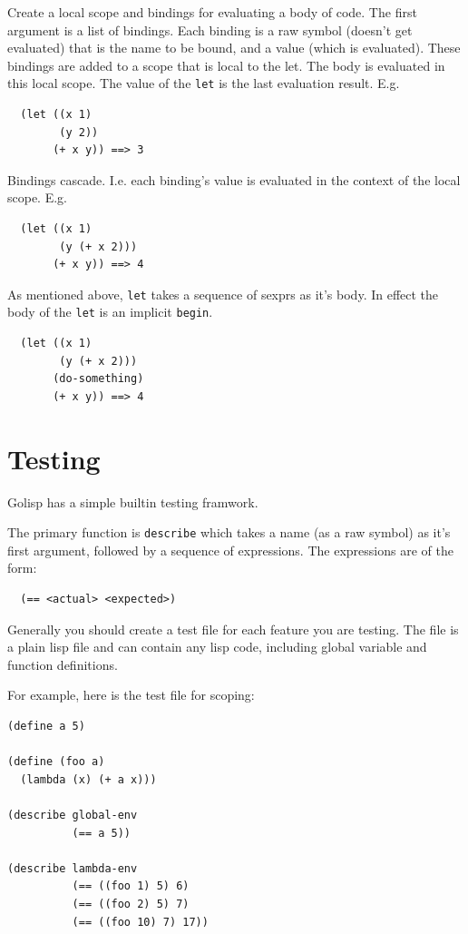 \documentclass[12pt]{article}
\begin{document}

Create a local scope and bindings for evaluating a body of code. The
first argument is a list of bindings. Each binding is a raw symbol
(doesn't get evaluated) that is the name to be bound, and a value
(which is evaluated). These bindings are added to a scope that is
local to the let. The body is evaluated in this local scope. The value
of the \verb|let| is the last evaluation result. E.g.

\begin{verbatim}
  (let ((x 1)
        (y 2))
       (+ x y)) ==> 3
\end{verbatim}

Bindings cascade. I.e. each binding's value is evaluated in the
context of the local scope. E.g.

\begin{verbatim}
  (let ((x 1)
        (y (+ x 2)))
       (+ x y)) ==> 4
\end{verbatim}

As mentioned above, \verb|let| takes a sequence of sexprs as it's
body. In effect the body of the \verb|let| is an implicit
\verb|begin|.

\begin{verbatim}
  (let ((x 1)
        (y (+ x 2)))
       (do-something)
       (+ x y)) ==> 4
\end{verbatim}

\section{Testing}

Golisp has a simple builtin testing framwork.

The primary function is \verb|describe| which takes a name (as a raw
symbol) as it's first argument, followed by a sequence of expressions.
The expressions are of the form:

\begin{verbatim}
  (== <actual> <expected>)
\end{verbatim}

Generally you should create a test file for each feature you are
testing. The file is a plain lisp file and can contain any lisp code,
including global variable and function definitions.

For example, here is the test file for scoping:

\begin{verbatim}
(define a 5)

(define (foo a)
  (lambda (x) (+ a x)))

(describe global-env
          (== a 5))

(describe lambda-env
          (== ((foo 1) 5) 6)
          (== ((foo 2) 5) 7)
          (== ((foo 10) 7) 17))
\end{verbatim}
\end{document}
